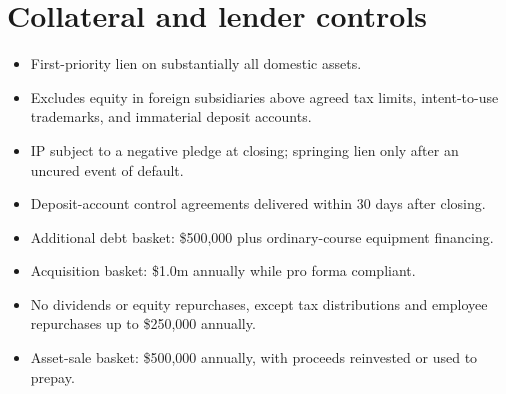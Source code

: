 \section{Collateral and lender controls}

\begin{minipage}[t]{0.49\textwidth}
  \begin{outlinebox}[title={\textbf{Collateral package}},coltitle=navy]
    \begin{itemize}
      \item First-priority lien on substantially all domestic assets.
      \item Excludes equity in foreign subsidiaries above agreed tax limits, intent-to-use trademarks, and immaterial deposit accounts.
      \item IP subject to a negative pledge at closing; springing lien only after an uncured event of default.
      \item Deposit-account control agreements delivered within 30 days after closing.
    \end{itemize}
  \end{outlinebox}
\end{minipage}
\hfill
\begin{minipage}[t]{0.49\textwidth}
  \begin{outlinebox}[title={\textbf{Negative covenants}},coltitle=navy]
    \begin{itemize}
      \item Additional debt basket: \$500,000 plus ordinary-course equipment financing.
      \item Acquisition basket: \$1.0m annually while pro forma compliant.
      \item No dividends or equity repurchases, except tax distributions and employee repurchases up to \$250,000 annually.
      \item Asset-sale basket: \$500,000 annually, with proceeds reinvested or used to prepay.
    \end{itemize}
  \end{outlinebox}
\end{minipage}
